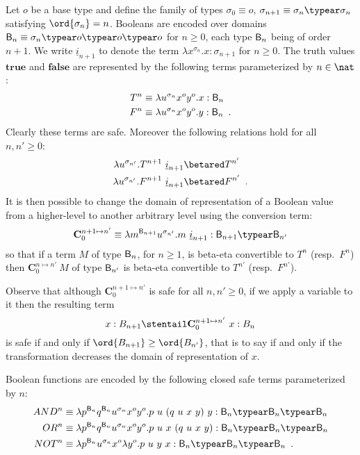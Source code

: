 Let $o$ be a base type and define the family of types $\sigma_0
\equiv o$, $\sigma_{n+1} \equiv \sigma_n\typear\sigma_n$ satisfying
$\ord{\sigma_n} = n$. Booleans are encoded over domains $\booltype_n
\equiv \sigma_n\typear o\typear o\typear o$ for $n\geq0$, each type
$\mathsf{B}_n$ being of order $n+1$. We write $\underline{i}_{n+1}$
to denote the term $\lambda x^{\sigma_n}.x : \sigma_{n+1}$ for
$n\geq0$. The truth values $\mathbf{true}$ and $\mathbf{false}$ are
represented by the following terms parameterized by $n \in \nat$:
\begin{align*}
  T^n &\equiv \lambda u^{\sigma_n} x^o y^o .x : \mathsf{B}_{n}\\
  F^n &\equiv \lambda u^{\sigma_n} x^o y^o .y : \mathsf{B}_{n} \enspace .
\end{align*}
Clearly these terms are safe. Moreover the following relations hold
for all $n,n'\geq 0$:
\begin{align*}
  \lambda u^{\sigma_{n'}} . T^{n+1}~\underline{i}_{n+1}  &\betared  T^{n'} \\
  \lambda u^{\sigma_{n'}} . F^{n+1}~\underline{i}_{n+1}  &\betared  F^{n'} \enspace .
\end{align*}
It is then possible to change the domain of representation of a Boolean value from a higher-level to another arbitrary level using the conversion term:
$$ \mathbf{C}^{n+1\mapsto n'}_0 \equiv \lambda m^{\booltype_{n+1}} u^{\sigma_{n'}}. m~\underline{i}_{n+1} : \booltype_{n+1} \typear \booltype_{n'}$$
so that if a term $M$ of type $\mathsf{B}_n$, for $n\geq1$, is beta-eta convertible to $T^n$ (resp.\ $F^n$) then $\mathbf{C}^{n\mapsto n'}_0~M$ of type $\mathsf{B}_{n'}$ is beta-eta convertible to $T^{n'}$ (resp.\ $F^{n'}$).

Observe that although $\mathbf{C}^{n+1\mapsto n'}_0$ is safe for all $n,n'\geq 0$, if we apply a variable to it then the resulting term
$$ x:B_{n+1} \stentail \mathbf{C}_0^{n+1\mapsto n'}~x : B_{n}$$
is safe if and only if $\ord{B_{n+1}}\geq\ord{B_{n'}}$, that is to say if and only if the transformation decreases the domain of representation of $x$.


Boolean functions are encoded by the following closed safe terms parameterized by $n$:
\begin{align*}
AND^n &\equiv \lambda p^{\booltype_n} q^{\booltype_n} u^{\sigma_n} x^o y^o . p~u~(q~u~x~y)~y : \booltype_n\typear\booltype_n\typear\booltype_n \\
OR^n &\equiv \lambda p^{\booltype_n} q^{\booltype_n} u^{\sigma_n} x^o y^o . p~u~x~(q~u~x~y) : \booltype_n\typear\booltype_{n}\typear\booltype_n \\
NOT^n &\equiv \lambda p^{\booltype_n} u^{\sigma_n} x^o \lambda y^o . p~u~y~x : \booltype_n\typear\booltype_n\typear\booltype_n
\enspace .
\end{align*}

